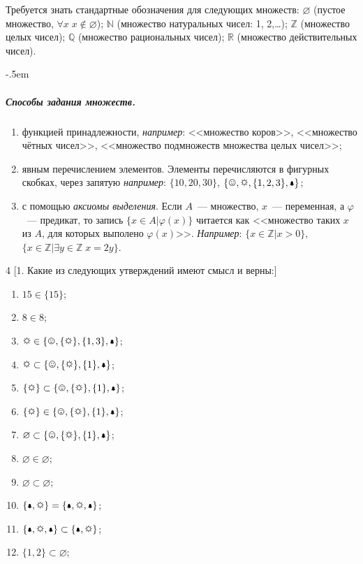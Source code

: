 \documentclass[a4paper,10pt]{article}
\begin{document}
Требуется знать стандартные обозначения для следующих множеств: $\varnothing$ (пустое множество, $\forall x\;x\not\in\varnothing$); $\mathbb N$ (множество натуральных чисел: 1, 2,\ldots); $\mathbb Z$ (множество целых чисел); $\mathbb Q$ (множество рациональных чисел); $\mathbb R$ (множество действительных чисел).

\kern-.5em\subparagraph*{Способы задания множеств.}
\begin{enumerate}
\item функцией принадлежности, \textit{например}: <<множество коров>>, <<множество чётных чисел>>, <<множество подмножеств множества целых чисел>>;
\item явным перечислением элементов. Элементы перечисляются в фигурных скобках, через запятую \textit{например}: $\{10,20,30\}$, $\{\smiley, \sun, \{1,2,3\}, \bell\}$;
\item с помощью \textit{аксиомы выделения}. Если $A$~--- множество, $x$~--- переменная, а $\varphi$~--- предикат, то запись $\{x\in A|\varphi(x)\}$ читается как <<множество таких $x$ из $A$, для которых выполено $\varphi(x)$>>. \textit{Например}: $\{x\in\mathbb Z|x>0\}$, $\{x\in\mathbb Z|\exists y\in\mathbb Z\;x=2y\}$.
\end{enumerate}

\begin{multicols}{4}
	[1. Какие из следующих утверждений имеют смысл и верны:]
	\begin{enumerate}[label=(\arabic*)\,]
		\item $15\in\{15\}$;
		\item $8\in8$;
		\item $\sun\in\{\smiley, \{\sun\}, \{1,3\}, \bell\}$;
		\item $\sun\subset\{\smiley, \{\sun\}, \{1\}, \bell\}$;
		\item $\{\sun\}\subset\{\smiley, \{\sun\}, \{1\}, \bell\}$;
		\item $\{\sun\}\in\{\smiley, \{\sun\}, \{1\}, \bell\}$;
		\item $\varnothing\subset\{\smiley, \{\sun\}, \{1\}, \bell\}$;
		\item $\varnothing\in\varnothing$;
		\item $\varnothing\subset\varnothing$;
		\item $\{\bell,\sun\}=\{\bell,\sun,\bell\}$;
		\item $\{\bell,\sun,\bell\}\subset\{\bell,\sun\}$;
		\item $\{1,2\}\subset\varnothing$;
	\end{enumerate}
\end{multicols}
\end{document}
